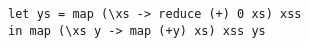 \begin{lstlisting}
let ys = map (\xs -> reduce (+) 0 xs) xss
in map (\xs y -> map (+y) xs) xss ys
\end{lstlisting}